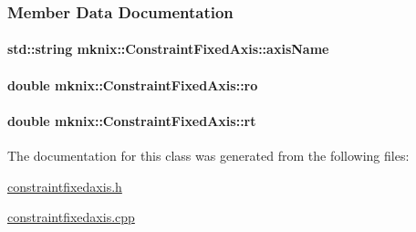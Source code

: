 \subsubsection{Member Data Documentation}
\hypertarget{classmknix_1_1_constraint_fixed_axis_a71a1a8d7efc201a678dbfececa068ecb}{
\paragraph[{axis\-Name}]{\setlength{\rightskip}{0pt plus 5cm}std\-::string mknix\-::\-Constraint\-Fixed\-Axis\-::axis\-Name\hspace{0.3cm}{\ttfamily [protected]}}}\label{classmknix_1_1_constraint_fixed_axis_a71a1a8d7efc201a678dbfececa068ecb}
\hypertarget{classmknix_1_1_constraint_fixed_axis_aaef8888c92c6fcba5d4644ab0cc8c984}{
\paragraph[{ro}]{\setlength{\rightskip}{0pt plus 5cm}double mknix\-::\-Constraint\-Fixed\-Axis\-::ro\hspace{0.3cm}{\ttfamily [protected]}}}\label{classmknix_1_1_constraint_fixed_axis_aaef8888c92c6fcba5d4644ab0cc8c984}
\hypertarget{classmknix_1_1_constraint_fixed_axis_aae85721e0c2a16397b98fdb09ba72361}{
\paragraph[{rt}]{\setlength{\rightskip}{0pt plus 5cm}double mknix\-::\-Constraint\-Fixed\-Axis\-::rt\hspace{0.3cm}{\ttfamily [protected]}}}\label{classmknix_1_1_constraint_fixed_axis_aae85721e0c2a16397b98fdb09ba72361}


The documentation for this class was generated from the following files\-:\begin{DoxyCompactItemize}
\item 
\hyperlink{constraintfixedaxis_8h}{constraintfixedaxis.\-h}\item 
\hyperlink{constraintfixedaxis_8cpp}{constraintfixedaxis.\-cpp}\end{DoxyCompactItemize}
